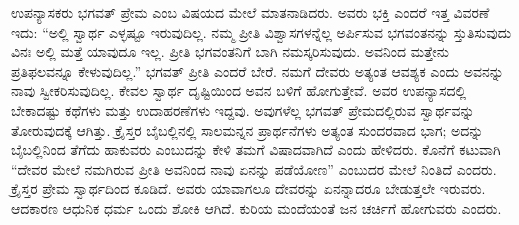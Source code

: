  ಉಪನ್ಯಾಸಕರು ಭಗವತ್ ಪ್ರೇಮ ಎಂಬ ವಿಷಯದ ಮೇಲೆ ಮಾತನಾಡಿದರು. ಅವರು ಭಕ್ತಿ ಎಂದರೆ ಇತ್ತ ವಿವರಣೆ ಇದು: “ಅಲ್ಲಿ ಸ್ವಾರ್ಥ ಎಳ್ಳಷ್ಟೂ ಇರುವುದಿಲ್ಲ. ನಮ್ಮ ಪ್ರೀತಿ ವಿಶ್ವಾಸಗಳನ್ನೆಲ್ಲ ಅರ್ಪಿಸುವ ಭಗವಂತನನ್ನು ಸ್ತುತಿಸುವುದು ವಿನಃ ಅಲ್ಲಿ ಮತ್ತೆ ಯಾವುದೂ ಇಲ್ಲ. ಪ್ರೀತಿ ಭಗವಂತನಿಗೆ ಬಾಗಿ ನಮಸ್ಕರಿಸುವುದು. ಅವನಿಂದ ಮತ್ತೇನು ಪ್ರತಿಫಲವನ್ನೂ ಕೇಳುವುದಿಲ್ಲ.” ಭಗವತ್ ಪ್ರೀತಿ ಎಂದರೆ ಬೇರೆ. ನಮಗೆ ದೇವರು ಅತ್ಯಂತ ಆವಶ್ಯಕ ಎಂದು ಅವನನ್ನು ನಾವು ಸ್ವೀಕರಿಸುವುದಿಲ್ಲ. ಕೇವಲ ಸ್ವಾರ್ಥ ದೃಷ್ಟಿಯಿಂದ ಅವನ ಬಳಿಗೆ ಹೋಗುತ್ತೇವೆ. ಅವರ ಉಪನ್ಯಾಸದಲ್ಲಿ ಬೇಕಾದಷ್ಟು ಕಥೆಗಳು ಮತ್ತು ಉದಾಹರಣೆಗಳು ಇದ್ದವು. ಅವುಗಳೆಲ್ಲ ಭಗವತ್ ಪ್ರೇಮದಲ್ಲಿರುವ ಸ್ವಾರ್ಥವನ್ನು ತೋರುವುದಕ್ಕೆ ಆಗಿತ್ತು. ಕ್ರೈಸ್ತರ ಬೈಬಲ್ಲಿನಲ್ಲಿ ಸಾಲಮನ್ನನ ಪ್ರಾರ್ಥನೆಗಳು ಅತ್ಯಂತ ಸುಂದರವಾದ ಭಾಗ; ಅದನ್ನು ಬೈಬಲ್ಲಿನಿಂದ ತೆಗೆದು ಹಾಕುವರು ಎಂಬುದನ್ನು ಕೇಳಿ ತಮಗೆ ವಿಷಾದವಾಗಿದೆ ಎಂದು ಹೇಳಿದರು. ಕೊನೆಗೆ ಕಟುವಾಗಿ “ದೇವರ ಮೇಲೆ ನಮಗಿರುವ ಪ್ರೀತಿ ಅವನಿಂದ ನಾವು ಏನನ್ನು ಪಡೆಯೋಣ” ಎಂಬುದರ ಮೇಲೆ ನಿಂತಿದೆ ಎಂದರು. ಕ್ರೈಸ್ತರ ಪ್ರೇಮ ಸ್ವಾರ್ಥದಿಂದ ಕೂಡಿದೆ. ಅವರು ಯಾವಾಗಲೂ ದೇವರನ್ನು ಏನನ್ನಾದರೂ ಬೇಡುತ್ತಲೇ ಇರುವರು. ಆದಕಾರಣ ಆಧುನಿಕ ಧರ್ಮ ಒಂದು ಶೋಕಿ ಆಗಿದೆ. ಕುರಿಯ ಮಂದೆಯಂತೆ ಜನ ಚರ್ಚಿಗೆ ಹೋಗುವರು ಎಂದರು.

